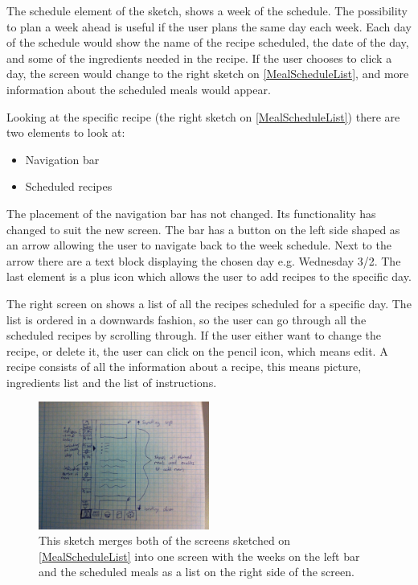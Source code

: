 The schedule element of the sketch, shows a week of the schedule. The possibility to plan a week ahead is useful if the user plans the same day each week. Each day of the schedule would show the name of the recipe scheduled, the date of the day, and some of the ingredients needed in the recipe. If the user chooses to click a day, the screen would change to the right sketch on \cref{MealScheduleList}, and more information about the scheduled meals would appear.

Looking at the specific recipe (the right sketch on \cref{MealScheduleList}) there are two elements to look at:   

\begin{itemize}
    \item Navigation bar
    \item Scheduled recipes
\end{itemize}

The placement of the navigation bar has not changed. Its functionality has changed to suit the new screen. The bar has a button on the left side shaped as an arrow allowing the user to navigate back to the week schedule. Next to the arrow there are a text block displaying the chosen day e.g. Wednesday 3/2. The last element is a plus icon which allows the user to add recipes to the specific day.  

The right screen on  shows a list of all the recipes scheduled for a specific day. The list is ordered in a downwards fashion, so the user can go through all the scheduled recipes by scrolling through. If the user either want to change the recipe, or delete it, the user can click on the pencil icon, which means edit. A recipe consists of all the information about a recipe, this means picture, ingredients list and the list of instructions.

\begin{figure}[H]
	\centering
    \includegraphics[width=0.5\textwidth]{Grafik/FoodPlanner/FinalMealScheduleSketch2}
	\caption{This sketch merges both of the screens sketched on \cref{MealScheduleList} into one screen with the weeks on the left bar and the scheduled meals as a list on the right side of the screen.}
	\label{MealScheduleBar}
\end{figure}

